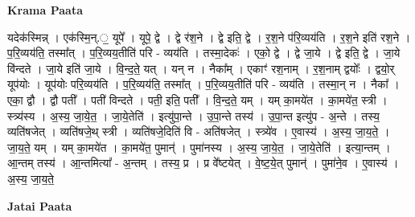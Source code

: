 \documentclass[17pt]{extarticle}
\begin{document}
\textbf{Krama Paata} \newline

यदेक॑स्मिन्न् । एक॑स्मि॒न्.॒ यूपे᳚ । यूपे॒ द्वे । द्वे र॑श॒ने । द्वे इति॒ द्वे । र॒श॒ने प॑रि॒व्यय॑ति । र॒श॒ने इति॑ रश॒ने । प॒रि॒व्यय॑ति॒ तस्मा᳚त् । प॒रि॒व्यय॒तीति॑ परि - व्यय॑ति । तस्मा॒देकः॑ । एको॒ द्वे । द्वे जा॒ये । द्वे इति॒ द्वे । जा॒ये वि॑न्दते । जा॒ये इति॑ जा॒ये । वि॒न्द॒ते॒ यत् । यन् न । नैका᳚म् । एकाꣳ॑ रश॒नाम् । र॒श॒नाम् द्वयोः᳚ । द्वयो॒र् यूप॑योः । यूप॑योः परि॒व्यय॑ति । प॒रि॒व्यय॑ति॒ तस्मा᳚त् । प॒रि॒व्यय॒तीति॑ परि - व्यय॑ति । तस्मा॒न् न । नैका᳚ । एका॒ द्वौ । द्वौ पती᳚ । पती॑ विन्दते । पती॒ इति॒ पती᳚ । वि॒न्द॒ते॒ यम् । यम् का॒मये॑त । का॒मये॑त॒ स्त्री । स्त्र्य॑स्य । अ॒स्य॒ जा॒ये॒त॒ । जा॒ये॒तेति॑ । इत्यु॑पा॒न्ते । उ॒पा॒न्ते तस्य॑ । उ॒पा॒न्त इत्यु॑प - अ॒न्ते । तस्य॒ व्यति॑षजेत् । व्यति॑षजे॒थ् स्त्री । व्यति॑षजे॒दिति॑ वि - अति॑षजेत् । स्त्र्ये॑व । ए॒वास्य॑ । अ॒स्य॒ जा॒य॒ते॒ । जा॒य॒ते॒ यम् । यम् का॒मये॑त । का॒मये॑त॒ पुमान्॑ । पुमा॑नस्य । अ॒स्य॒ जा॒ये॒त॒ । जा॒ये॒तेति॑ । इत्या॒न्तम् । आ॒न्तम् तस्य॑ । आ॒न्तमित्या᳚ - अ॒न्तम् । तस्य॒ प्र । प्र वे᳚ष्टयेत् । 
वे॒ष्ट॒ये॒त् पुमान्॑ । पुमा॑ने॒व । ए॒वास्य॑ । अ॒स्य॒ जा॒य॒ते॒ \newline

\textbf{Jatai Paata} \newline
\end{document}
